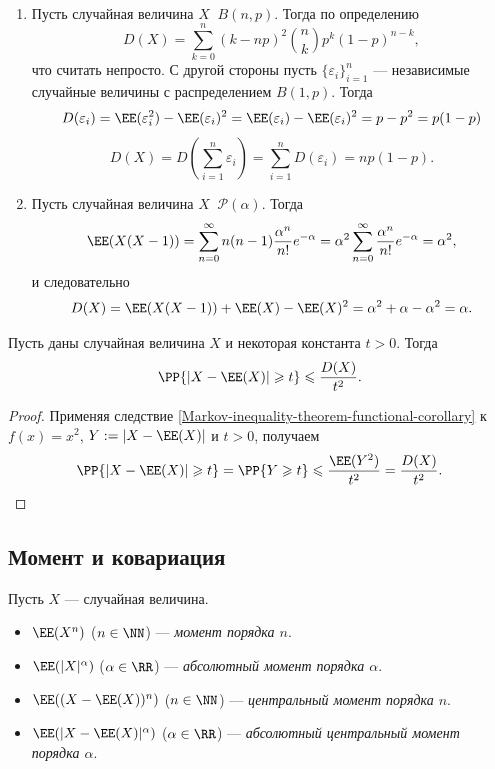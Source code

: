 \documentclass[12pt,a4paper]{article}
\newcommand{\Deq}{\mathop{\stackrel{\mathcal{D}}{=}}}
\begin{document}
    \begin{example}\ 
        \begin{enumerate}
            \item Пусть случайная величина $X \Deq B(n, p)$. Тогда по определению
                \[D(X) = \sum_{k=0}^n (k-np)^2 \binom{n}{k} p^k (1-p)^{n-k},\]
                что считать непросто. С другой стороны пусть $\{\varepsilon_i\}_{i=1}^n$ --- независимые случайные величины с распределением $B(1, p)$. Тогда
                \[
                    D(\varepsilon_i)
                    = \EE(\varepsilon_i^2) - \EE(\varepsilon_i)^2
                    = \EE(\varepsilon_i) - \EE(\varepsilon_i)^2
                    = p - p^2
                    = p(1-p)
                \]
                \[
                    D(X)
                    = D\left(\sum_{i=1}^n \varepsilon_i\right)
                    = \sum_{i=1}^n D(\varepsilon_i)
                    = np(1-p).
                \]
            \item Пусть случайная величина $X \Deq \mathcal{P}(\alpha)$. Тогда
                \[\EE(X(X-1)) = \sum_{n=0}^\infty n(n-1) \frac{\alpha^n}{n!} e^{-\alpha} = \alpha^2 \sum_{n=0}^\infty \frac{\alpha^n}{n!} e^{-\alpha} = \alpha^2,\]
                и следовательно
                \[D(X) = \EE(X(X-1)) + \EE(X) - \EE(X)^2 = \alpha^2 + \alpha - \alpha^2 = \alpha.\]
        \end{enumerate}
    \end{example}

    \begin{theorem}
        Пусть даны случайная величина $X$ и некоторая константа $t > 0$. Тогда
        \[\PP\{|X - \EE(X)| \geqslant t\} \leqslant \frac{D(X)}{t^2}.\]
    \end{theorem}

    \begin{proof}
        Применяя следствие \ref{Markov-inequality-theorem-functional-corollary} к $f(x) = x^2$, $Y := |X - \EE(X)|$ и $t > 0$, получаем
        \[\PP\{|X - \EE(X)| \geqslant t\} = \PP\{Y \geqslant t\} \leqslant \frac{\EE(Y^2)}{t^2} = \frac{D(X)}{t^2}.\]
    \end{proof}

    \subsection{Момент и ковариация}

    \begin{definition}
        Пусть $X$ --- случайная величина.
        \begin{itemize}
            \item $\EE(X^n)$ ($n \in \NN$) --- \emph{момент порядка $n$}.
            \item $\EE(|X|^\alpha)$ ($\alpha \in \RR$) --- \emph{абсолютный момент порядка $\alpha$}.
            \item $\EE((X - \EE(X))^n)$ ($n \in \NN$) --- \emph{центральный момент порядка $n$}.
            \item $\EE(|X - \EE(X)|^\alpha)$ ($\alpha \in \RR$) --- \emph{абсолютный центральный момент порядка $\alpha$}.
        \end{itemize}
    \end{definition}
\end{document}
